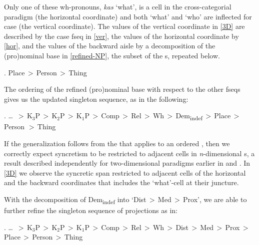 \begin{center}
\end{center}

\noindent Only one of these wh-pronouns, \textit{kas} `what', is a cell in the cross-categorial paradigm (the horizontal coordinate) and both `what' and `who' are inflected for case (the vertical coordinate). The values of the vertical coordinate in \ref{3D} are described by the case fseq in \ref{ver}, the values of the horizontal coordinate by \ref{hor}, and the values of the backward aisle by a decomposition of the (pro)nominal base in \ref{refined-NP}, the subset of the s, repeated below.

\ex. Place\,$>$\,Person\,$>$\,Thing

The ordering of the refined (pro)nominal base with respect to the other fseqs gives us the updated singleton sequence, as in the following:

\ex. \ldots \ $>$\,K$_{3}$P\,$>$\,K$_{2}$P\,$>$\,K$_{1}$P\,$>$\,Comp\,$>$\,Rel\,$>$\,Wh\,$>$\,Dem\textsubscript{indef}\,$>$\,Place\,$>$\\
Person $>$\,Thing

\noindent
If the  generalization follows from the  that applies to an ordered , then we correctly expect syncretism to be restricted to adjacent cells in \textit{n}-dimensional s, a result described independently for two-dimensional paradigms earlier in \cite{CahaPantcheva2012} and \cite{GVW2018}. In \ref{3D} we observe the syncretic span restricted to adjacent cells of the horizontal and the backward coordinates that includes the `what'-cell at their juncture.
\par With the decomposition of Dem\textsubscript{indef} into `Dist\,$>$\,Med\,$>$\,Prox', we are able to further refine the singleton sequence of projections as in:

\ex. \ldots \ $>$\,K$_{3}$P\,$>$\,K$_{2}$P\,$>$\,K$_{1}$P\,$>$\,Comp\,$>$\,Rel\,$>$\,Wh\,$>$\,Dist\,$>$\,Med\,$>$\,Prox\,$>$\\ 
Place\,$>$\,Person\,$>$\,Thing

